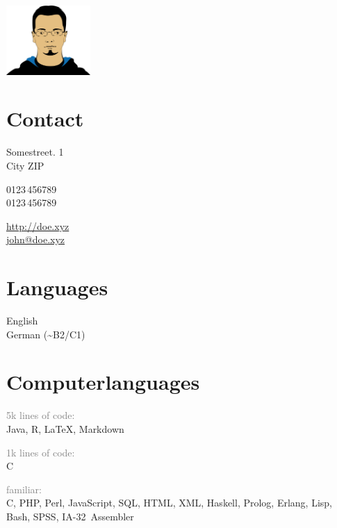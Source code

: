 \documentclass{scrcv}
\newcommand{\Cpp}{C\raisebox{.25\height}{\scriptsize ++}}
\newcommand{\Csharp}{C\raisebox{.25\height}{\scriptsize \#}}
\newcommand{\less}{\raisebox{.25\height}{\scriptsize >}}
\begin{document}
\frenchspacing


\begin{aside}
\includegraphics[width=3.2cm]{gfx/john_doe.png}\\

\section{Contact}

Somestreet. 1\\
City ZIP

0123\,456789\\
0123\,456789

{\footnotesize\href{http://doe.xyz}{\ttfamily{}\selectfont http:/\hspace{-2pt}/doe.xyz}}\\
{\scriptsize\href{mailto:john@doe.xyz}{\ttfamily{}\selectfont john@doe.xyz}}\\

\section{Languages}

English\\
German (\textasciitilde B2/C1)\\

\section{Computer\-languages}
\vspace{.5ex}
\textcolor{gray}{\headingfont \less{}5k lines of code:}\\
Java, R, \LaTeX, Markdown

\textcolor{gray}{\headingfont \less{}1k lines of code:}\\
\Csharp

\textcolor{gray}{\headingfont familiar:}\\
\Cpp, PHP, Perl, JavaScript, SQL, HTML, XML, Haskell, Prolog, Erlang, Lisp, Bash, SPSS, IA-32~Assembler
\end{aside}
\end{document}
